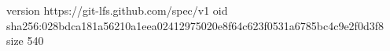 version https://git-lfs.github.com/spec/v1
oid sha256:028bdca181a56210a1eea02412975020e8f64c623f0531a6785bc4c9e2f0d3f8
size 540
